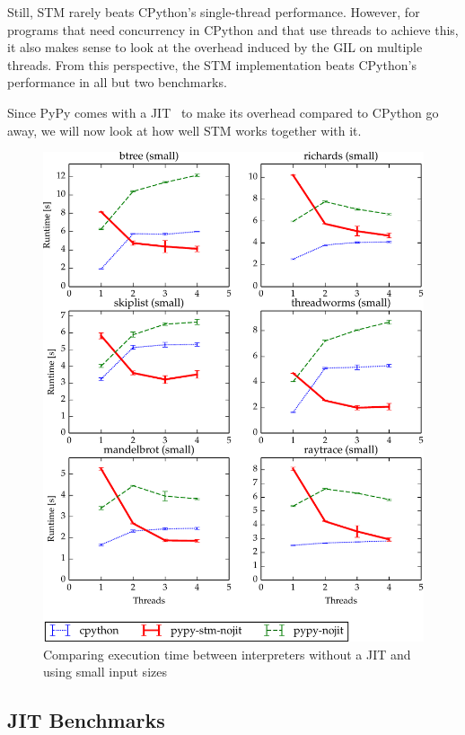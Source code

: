 \documentclass{sigplanconf}
\begin{document}
Still, STM rarely beats CPython's single-thread performance. However, for
programs that need concurrency in CPython and that use threads to
achieve this, it also makes sense to look at the overhead induced by
the GIL on multiple threads. From this perspective, the STM
implementation beats CPython's performance in all but two benchmarks.

Since PyPy comes with a JIT~\cite{cfbolz09} to make its overhead compared to CPython
go away, we will now look at how well STM works together with it.

\begin{figure}[h]
  \centering
  \includegraphics[width=1\columnwidth]{plots/performance_nojit.pdf}
  \caption{Comparing execution time between interpreters without a JIT
    and using small input sizes\label{fig:performance-nojit}}
\end{figure}



\subsection{JIT Benchmarks\label{subsec:jit-benchs}}
\end{document}
